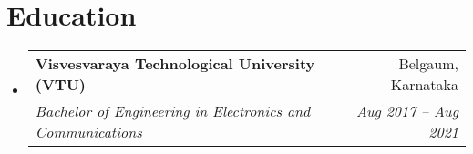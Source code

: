 \documentclass[letterpaper,11pt]{article}
\makeatletter
\newcommand{\resumeSubheading}[4]{
  \vspace{-2pt}\item
    \begin{tabular*}{0.97\textwidth}[t]{l@{\extracolsep{\fill}}r}
      \textbf{#1} & #2 \\
      \textit{\small#3} & \textit{\small #4} \\
    \end{tabular*}\vspace{-7pt}
}
\newcommand{\resumeSubHeadingListStart}{\begin{itemize}[leftmargin=0.15in, label={}]}
\newcommand{\resumeSubHeadingListEnd}{\end{itemize}}
\makeatother
\begin{document}
%
\section{Education}
\resumeSubHeadingListStart
\resumeSubheading
{Visvesvaraya Technological University (VTU)}{Belgaum, Karnataka}
{Bachelor of Engineering in Electronics and Communications}{Aug 2017 -- Aug 2021}
\resumeSubHeadingListEnd
\end{document}

